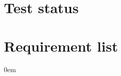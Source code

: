 \documentclass[a4paper,10pt,english]{sphinxmanual}
\begin{document}
\section{Test status}
\label{\detokenize{traceability:test-status}}\label{\detokenize{traceability:needpie-traceability-0}}
\noindent{}


\section{Requirement list}
\label{\detokenize{traceability:requirement-list}}\label{\detokenize{traceability:needlist-traceability-0}}
\begin{DUlineblock}{0em}
\item[] {\hyperref[\detokenize{requirements/requirements:REQ_SOC}]{}}
\item[] {\hyperref[\detokenize{requirements/requirements:REQ_LOW_WARN}]{}}
\item[] {\hyperref[\detokenize{requirements/requirements:REQ_LOG}]{}}
\end{DUlineblock}



\renewcommand{\indexname}{Index}
\printindex
\end{document}

